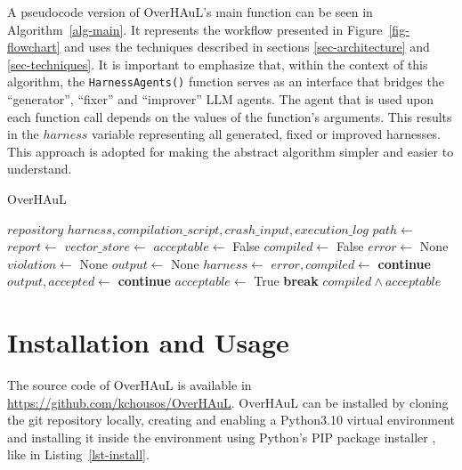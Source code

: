 \documentclass[
  a4paper,
]{scrreprt}
\theoremstyle{definition}
\theoremstyle{remark}
\begin{document}
A pseudocode version of OverHAuL's main function can be seen in
Algorithm~\ref{alg-main}. It represents the workflow presented in
Figure~\ref{fig-flowchart} and uses the techniques described in sections
\ref{sec-architecture} and \ref{sec-techniques}. It is important to
emphasize that, within the context of this algorithm, the
\texttt{HarnessAgents()} function serves as an interface that bridges
the ``generator'', ``fixer'' and ``improver'' LLM agents. The agent that
is used upon each function call depends on the values of the function's
arguments. This results in the \(harness\) variable representing all
generated, fixed or improved harnesses. This approach is adopted for
making the abstract algorithm simpler and easier to understand.

\begin{algorithm}[H]
\caption{OverHAuL}
\label{alg-main}
\begin{algorithmic}[1]
\Require $repository$
\Ensure $harness, compilation\_script, crash\_input, execution\_log$
  \State $path \gets$ 
  \State $report \gets$ 
  \State $vector\_store \gets$ 
  \State $acceptable \gets$ False
  \State $compiled \gets$ False
  \State $error \gets$ None
  \State $violation \gets$ None
  \State $output \gets$ None
    \State $harness \gets$ 
    \State $error, compiled \gets$ 
      \State \textbf{continue} 
    \EndIf
    \State $output, accepted \gets $
      \State \textbf{continue} 
    \Else
      \State $acceptable \gets$ True
      \State \textbf{break}
    \EndIf
  \EndFor
  \State \Return $compiled \land acceptable$
\end{algorithmic}
\end{algorithm}

\section{Installation and Usage}\label{sec-install}

The source code of OverHAuL is available in
\url{https://github.com/kchousos/OverHAuL}. OverHAuL can be installed by
cloning the git repository locally, creating and enabling a Python3.10
virtual environment \autocite{venv} and installing it inside the
environment using Python's PIP package installer \autocite{pip}, like in
Listing~\ref{lst-install}.
\end{document}
